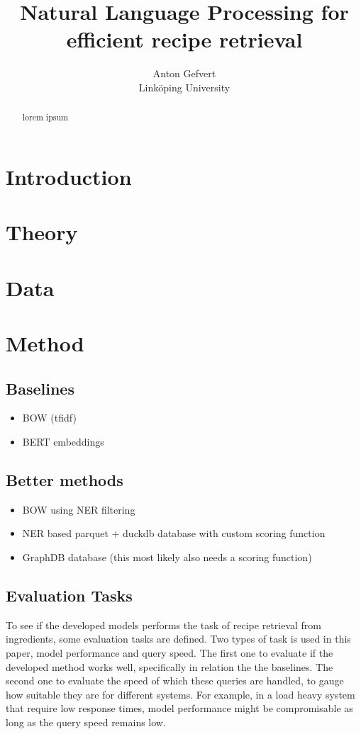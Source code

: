 \documentclass[11pt]{article}
\title{Natural Language Processing for efficient recipe retrieval}
\date{}
\author{Anton Gefvert \\ Linköping University}
\begin{document}
\maketitle
\begin{abstract}
    lorem ipsum
\end{abstract}

\section{Introduction}

\section{Theory}

\section{Data}

\section{Method}
\subsection{Baselines}
\begin{itemize}
    \item BOW (tfidf)
    \item BERT embeddings
\end{itemize}

\subsection{Better methods}
\begin{itemize}
    \item BOW using NER filtering
    \item NER based parquet + duckdb database with custom scoring function
    \item GraphDB database (this most likely also needs a scoring function)
\end{itemize}

\subsection{Evaluation Tasks}
To see if the developed models performs the task of recipe retrieval from
ingredients, some evaluation tasks are defined.
Two types of task is used in this paper, model performance and query speed.
The first one to evaluate if the developed method works well, specifically in
relation the the baselines.
The second one to evaluate the speed of which these queries are handled, to
gauge how suitable they are for different systems.
For example, in a load heavy system that require low response times, model
performance might be compromisable as long as the query speed remains low.
\end{document}
